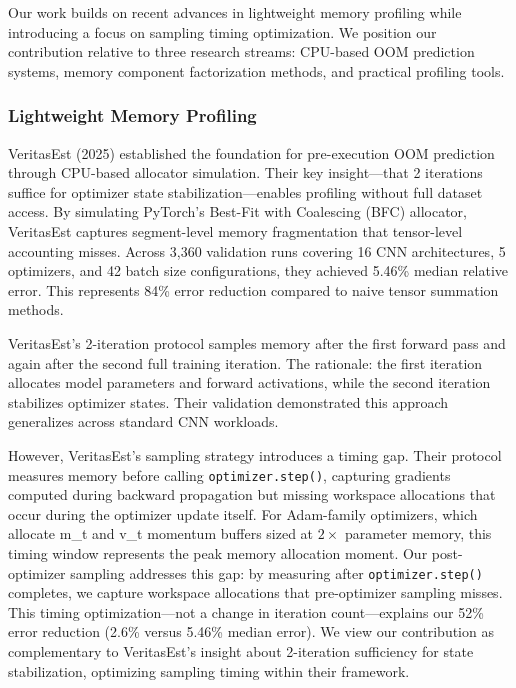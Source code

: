 
Our work builds on recent advances in lightweight memory profiling while introducing a focus on sampling timing optimization. We position our contribution relative to three research streams: CPU-based OOM prediction systems, memory component factorization methods, and practical profiling tools.

\subsubsection{Lightweight Memory Profiling}

VeritasEst (2025) established the foundation for pre-execution OOM prediction through CPU-based allocator simulation. Their key insight---that 2 iterations suffice for optimizer state stabilization---enables profiling without full dataset access. By simulating PyTorch's Best-Fit with Coalescing (BFC) allocator, VeritasEst captures segment-level memory fragmentation that tensor-level accounting misses. Across 3,360 validation runs covering 16 CNN architectures, 5 optimizers, and 42 batch size configurations, they achieved 5.46\% median relative error. This represents 84\% error reduction compared to naive tensor summation methods.

VeritasEst's 2-iteration protocol samples memory after the first forward pass and again after the second full training iteration. The rationale: the first iteration allocates model parameters and forward activations, while the second iteration stabilizes optimizer states. Their validation demonstrated this approach generalizes across standard CNN workloads.

However, VeritasEst's sampling strategy introduces a timing gap. Their protocol measures memory before calling \texttt{optimizer.step()}, capturing gradients computed during backward propagation but missing workspace allocations that occur during the optimizer update itself. For Adam-family optimizers, which allocate m\_t and v\_t momentum buffers sized at $2\times$ parameter memory, this timing window represents the peak memory allocation moment. Our post-optimizer sampling addresses this gap: by measuring after \texttt{optimizer.step()} completes, we capture workspace allocations that pre-optimizer sampling misses. This timing optimization---not a change in iteration count---explains our 52\% error reduction (2.6\% versus 5.46\% median error). We view our contribution as complementary to VeritasEst's insight about 2-iteration sufficiency for state stabilization, optimizing sampling timing within their framework.

